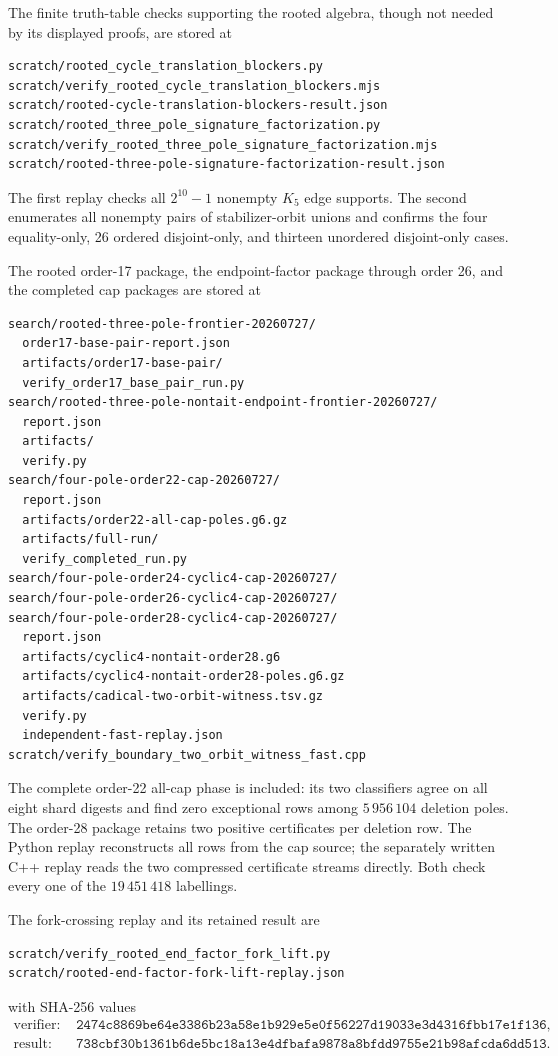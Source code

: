 \documentclass[11pt]{article}
\theoremstyle{definition}
\theoremstyle{remark}
\begin{document}
The finite truth-table checks supporting the rooted algebra, though not
needed by its displayed proofs, are stored at
\begin{verbatim}
scratch/rooted_cycle_translation_blockers.py
scratch/verify_rooted_cycle_translation_blockers.mjs
scratch/rooted-cycle-translation-blockers-result.json
scratch/rooted_three_pole_signature_factorization.py
scratch/verify_rooted_three_pole_signature_factorization.mjs
scratch/rooted-three-pole-signature-factorization-result.json
\end{verbatim}
The first replay checks all \(2^{10}-1\) nonempty \(K_5\) edge
supports.  The second enumerates all nonempty pairs of stabilizer-orbit
unions and confirms the four equality-only, 26 ordered disjoint-only,
and thirteen unordered disjoint-only cases.

The rooted order-17 package, the endpoint-factor package through order
26, and the completed cap packages are stored at
\begin{verbatim}
search/rooted-three-pole-frontier-20260727/
  order17-base-pair-report.json
  artifacts/order17-base-pair/
  verify_order17_base_pair_run.py
search/rooted-three-pole-nontait-endpoint-frontier-20260727/
  report.json
  artifacts/
  verify.py
search/four-pole-order22-cap-20260727/
  report.json
  artifacts/order22-all-cap-poles.g6.gz
  artifacts/full-run/
  verify_completed_run.py
search/four-pole-order24-cyclic4-cap-20260727/
search/four-pole-order26-cyclic4-cap-20260727/
search/four-pole-order28-cyclic4-cap-20260727/
  report.json
  artifacts/cyclic4-nontait-order28.g6
  artifacts/cyclic4-nontait-order28-poles.g6.gz
  artifacts/cadical-two-orbit-witness.tsv.gz
  verify.py
  independent-fast-replay.json
scratch/verify_boundary_two_orbit_witness_fast.cpp
\end{verbatim}
The complete order-22 all-cap phase is included: its two classifiers
agree on all eight shard digests and find zero exceptional rows among
\(5\,956\,104\) deletion poles.
The order-28 package retains two positive certificates per deletion
row.  The Python replay reconstructs all rows from the cap source; the
separately written C++ replay reads the two compressed certificate
streams directly.  Both check every one of the \(19\,451\,418\)
labellings.

The fork-crossing replay and its retained result are
\begin{verbatim}
scratch/verify_rooted_end_factor_fork_lift.py
scratch/rooted-end-factor-fork-lift-replay.json
\end{verbatim}
with SHA-256 values
\[
\begin{aligned}
\text{verifier: }&
\texttt{2474c8869be64e3386b23a58e1b929e5e0f56227d19033e3d4316fbb17e1f136},\\
\text{result: }&
\texttt{738cbf30b1361b6de5bc18a13e4dfbafa9878a8bfdd9755e21b98afcda6dd513}.
\end{aligned}
\]
\end{document}
